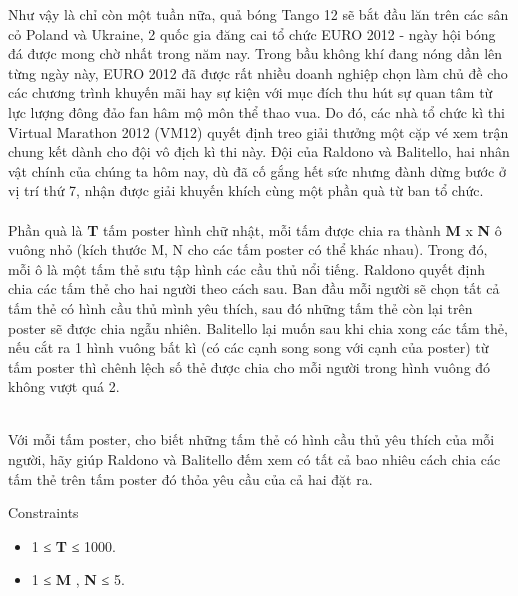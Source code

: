 Như vậy là chỉ còn một tuần nữa, quả bóng Tango 12 sẽ bắt đầu lăn trên các sân cỏ Poland và Ukraine, 2 quốc gia đăng cai tổ chức EURO 2012 - ngày hội bóng đá được mong chờ nhất trong năm nay. Trong bầu không khí đang nóng dần lên từng ngày này, EURO 2012 đã được rất nhiều doanh nghiệp chọn làm chủ đề cho các chương trình khuyến mãi hay sự kiện với mục đích thu hút sự quan tâm từ lực lượng đông đảo fan hâm mộ môn thể thao vua. Do đó, các nhà tổ chức kì thi Virtual Marathon 2012 (VM12) quyết định treo giải thưởng một cặp vé xem trận chung kết dành cho đội vô địch kì thi này. Đội của Raldono và Balitello, hai nhân vật chính của chúng ta hôm nay, dù đã cố gắng hết sức nhưng đành dừng bước ở vị trí thứ 7, nhận được giải khuyến khích cùng một phần quà từ ban tổ chức.
\\
\\Phần quà là \textbf{ T } tấm poster hình chữ nhật, mỗi tấm được chia ra thành \textbf{ M } x \textbf{ N } ô vuông nhỏ (kích thước M, N cho các tấm poster có thể khác nhau). Trong đó, mỗi ô là một tấm thẻ sưu tập hình các cầu thủ nổi tiếng. Raldono quyết định chia các tấm thẻ cho hai người theo cách sau. Ban đầu mỗi người sẽ chọn tất cả tấm thẻ có hình cầu thủ mình yêu thích, sau đó những tấm thẻ còn lại trên poster sẽ được chia ngẫu nhiên. Balitello lại muốn sau khi chia xong các tấm thẻ, nếu cắt ra 1 hình vuông bất kì (có các cạnh song song với cạnh của poster) từ tấm poster thì chênh lệch số thẻ được chia cho mỗi người trong hình vuông đó không vượt quá 2.


\\Với mỗi tấm poster, cho biết những tấm thẻ có hình cầu thủ yêu thích của mỗi người, hãy giúp Raldono và Balitello đếm xem có tất cả bao nhiêu cách chia các tấm thẻ trên tấm poster đó thỏa yêu cầu của cả hai đặt ra.

Constraints
\begin{itemize}
	\item 1 ≤ \textbf{ T } ≤ 1000.
\end{itemize}
\begin{itemize}
	\item 1 ≤ \textbf{ M } , \textbf{ N } ≤ 5.
\end{itemize}